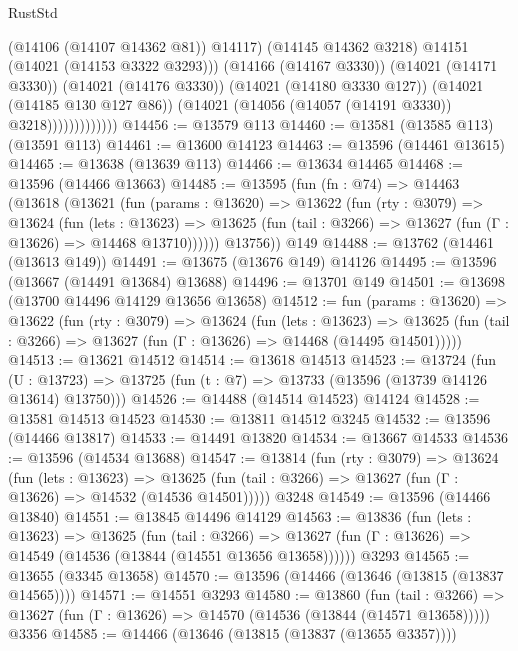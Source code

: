 \begin{lexlean}{RustStd}
\begin{coremodule}
{\begin{coremodule}
{{{{{{{{{{{{{{{{{{{{{{{{{{{{{{{{{{{{{{{                              (@14106 (@14107 @14362 @81))
                              @14117)
                            (@14145 @14362 @3218)
                            @14151
                            (@14021 (@14153 @3322 @3293)))
                          (@14166 (@14167 @3330))
                          (@14021 (@14171 @3330))
                          (@14021 (@14176 @3330))
                          (@14021 (@14180 @3330 @127))
                          (@14021 (@14185 @130 @127 @86))
                          (@14021 (@14056 (@14057 (@14191 @3330)) @3218)))))))))))))
@14456 := @13579 @113
@14460 := @13581 (@13585 @113) (@13591 @113)
@14461 := @13600 @14123
@14463 := @13596 (@14461 @13615)
@14465 := @13638 (@13639 @113)
@14466 := @13634 @14465
@14468 := @13596 (@14466 @13663)
@14485 := @13595
    (fun (fn : @74) =>
    @14463
      (@13618
        (@13621
          (fun (params : @13620) =>
          @13622
            (fun (rty : @3079) =>
            @13624
              (fun (lets : @13623) =>
              @13625 (fun (tail : @3266) => @13627 (fun (Γ : @13626) => @14468 @13710))))))
        @13756))
    @149
@14488 := @13762 (@14461 (@13613 @149))
@14491 := @13675 (@13676 @149) @14126
@14495 := @13596 (@13667 (@14491 @13684) @13688)
@14496 := @13701 @149
@14501 := @13698 (@13700 @14496 @14129 @13656 @13658)
@14512 := fun (params : @13620) =>
  @13622
    (fun (rty : @3079) =>
    @13624
      (fun (lets : @13623) =>
      @13625 (fun (tail : @3266) => @13627 (fun (Γ : @13626) => @14468 (@14495 @14501)))))
@14513 := @13621 @14512
@14514 := @13618 @14513
@14523 := @13724
    (fun (U : @13723) => @13725 (fun (t : @7) => @13733 (@13596 (@13739 @14126 @13614) @13750)))
@14526 := @14488 (@14514 @14523) @14124
@14528 := @13581 @14513 @14523
@14530 := @13811 @14512 @3245
@14532 := @13596 (@14466 @13817)
@14533 := @14491 @13820
@14534 := @13667 @14533
@14536 := @13596 (@14534 @13688)
@14547 := @13814
    (fun (rty : @3079) =>
    @13624
      (fun (lets : @13623) =>
      @13625 (fun (tail : @3266) => @13627 (fun (Γ : @13626) => @14532 (@14536 @14501)))))
    @3248
@14549 := @13596 (@14466 @13840)
@14551 := @13845 @14496 @14129
@14563 := @13836
    (fun (lets : @13623) =>
    @13625
      (fun (tail : @3266) =>
      @13627 (fun (Γ : @13626) => @14549 (@14536 (@13844 (@14551 @13656 @13658))))))
    @3293
@14565 := @13655 (@3345 @13658)
@14570 := @13596 (@14466 (@13646 (@13815 (@13837 @14565))))
@14571 := @14551 @3293
@14580 := @13860
    (fun (tail : @3266) => @13627 (fun (Γ : @13626) => @14570 (@14536 (@13844 (@14571 @13658)))))
    @3356
@14585 := @14466 (@13646 (@13815 (@13837 (@13655 @3357))))
}}}}}}}}}}}}}}}}}}}}}}}}}}}}}}}}}}}}}}}
\end{coremodule}}
\end{coremodule}
\end{lexlean}
